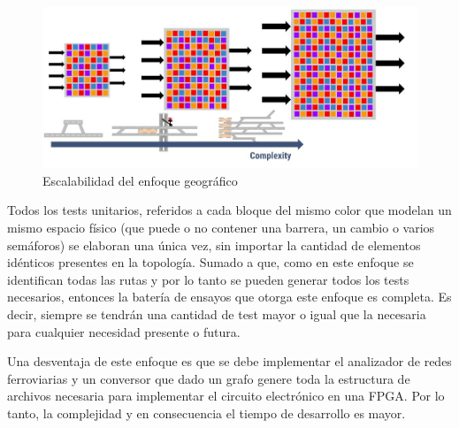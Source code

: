 			\begin{figure}[h]
			\centering
				\includegraphics[scale=.4]{./Figures/Geografico_complejidad}
				\caption{Escalabilidad del enfoque geográfico}
				\label{fig:Escala_Geografico}
			\end{figure}
		
			Todos los tests unitarios, referidos a cada bloque del mismo color que modelan un mismo espacio físico (que puede o no contener una barrera, un cambio o varios semáforos) se elaboran una única vez, sin importar la cantidad de elementos idénticos presentes en la topología. Sumado a que, como en este enfoque se identifican todas las rutas y por lo tanto se pueden generar todos los tests necesarios, entonces la batería de ensayos que otorga este enfoque es completa. Es decir, siempre se tendrán una cantidad de test mayor o igual que la necesaria para cualquier necesidad presente o futura.
		
			Una desventaja de este enfoque es que se debe implementar el analizador de redes ferroviarias y un conversor que dado un grafo genere toda la estructura de archivos necesaria para implementar el circuito electrónico en una FPGA. Por lo tanto, la complejidad y en consecuencia el tiempo de desarrollo es mayor.
			
			
			